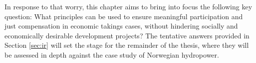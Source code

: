 \documentclass[12pt,a4paper]{book} %
\begin{document}
%
%

In response to that worry, this chapter aims to  bring into focus the following key question: What principles can be used to ensure meaningful participation and just compensation in economic takings cases, without hindering socially and economically desirable development projects? The tentative answers provided in Section \ref{sec:ir} will set the stage for the remainder of the thesis, where they will be assessed in depth against the case study of Norwegian hydropower.

\end{document}
